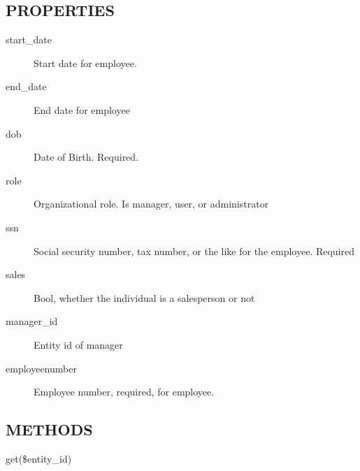 \begin{description}
\begin{description}
\begin{description}
\begin{description}
\begin{description}
\begin{description}
\begin{description}
\begin{description}
\subsection*{PROPERTIES\label{LedgerSMB::DBObject::Entity::Person::Employee_-_-_Employee_handling_for_LedgerSMB_PROPERTIES}}
\begin{description}

\item[{start\_date}] \mbox{}

Start date for employee.


\item[{end\_date}] \mbox{}

End date for employee


\item[{dob}] \mbox{}

Date of Birth.  Required.


\item[{role}] \mbox{}

Organizational role.  Is manager, user, or administrator


\item[{ssn}] \mbox{}

Social security number, tax number, or the like for the employee.  Required


\item[{sales}] \mbox{}

Bool, whether the individual is a salesperson or not


\item[{manager\_id}] \mbox{}

Entity id of manager


\item[{employeenumber}] \mbox{}

Employee number, required, for employee.

\end{description}
\subsection*{METHODS\label{LedgerSMB::DBObject::Entity::Person::Employee_-_-_Employee_handling_for_LedgerSMB_METHODS}}
\begin{description}

\item[{get(\$entity\_id)}] \mbox{}


\end{description}
\end{description}
\end{description}
\end{description}
\end{description}
\end{description}
\end{description}
\end{description}
\end{description}
